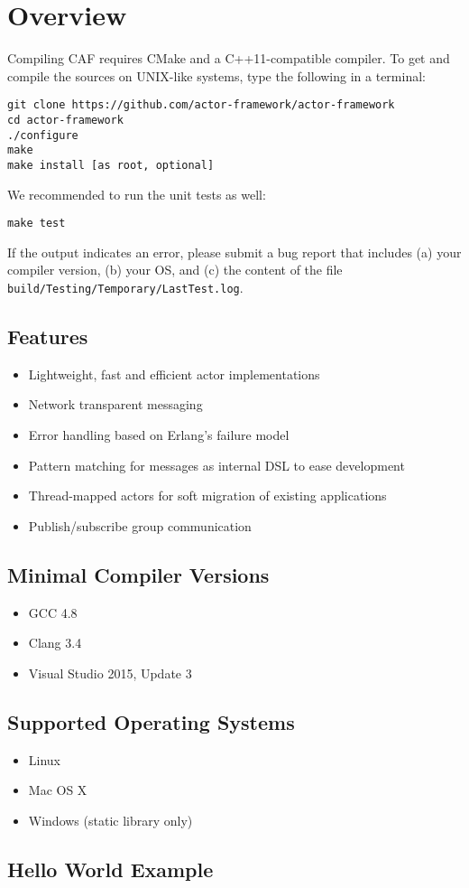 \section{Overview}

Compiling CAF requires CMake and a C++11-compatible compiler. To get and
compile the sources on UNIX-like systems, type the following in a terminal:

\begin{verbatim}
git clone https://github.com/actor-framework/actor-framework
cd actor-framework
./configure
make
make install [as root, optional]
\end{verbatim}

We recommended to run the unit tests as well:

\begin{verbatim}
make test
\end{verbatim}

If the output indicates an error, please submit a bug report that includes (a)
your compiler version, (b) your OS, and (c) the content of the file
\texttt{build/Testing/Temporary/LastTest.log}.

\subsection{Features}

\begin{itemize}
  \item Lightweight, fast and efficient actor implementations
  \item Network transparent messaging
  \item Error handling based on Erlang's failure model
  \item Pattern matching for messages as internal DSL to ease development
  \item Thread-mapped actors for soft migration of existing applications
  \item Publish/subscribe group communication
\end{itemize}


\subsection{Minimal Compiler Versions}

\begin{itemize}
  \item GCC 4.8
  \item Clang 3.4
  \item Visual Studio 2015, Update 3
\end{itemize}

\subsection{Supported Operating Systems}

\begin{itemize}
\item Linux
\item Mac OS X
\item Windows (static library only)
\end{itemize}

\clearpage
\subsection{Hello World Example}


